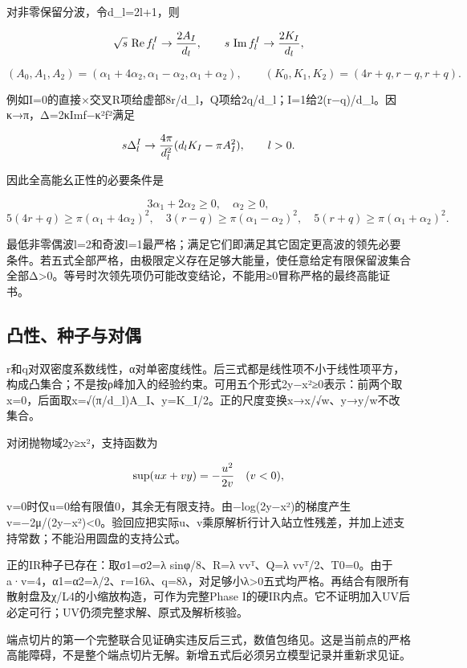\documentclass[
  10pt,
  a4paper,
]{article}
\begin{document}
对非零保留分波，令d\_l=2l+1，则

\[
\sqrt{s}\,\operatorname{Re}f_l^I\to{2A_I\over d_l},
\qquad s\,\operatorname{Im}f_l^I\to{2K_I\over d_l},
\]

\[
(A_0,A_1,A_2)=(\alpha_1+4\alpha_2,\alpha_1-\alpha_2,\alpha_1+\alpha_2),
\qquad(K_0,K_1,K_2)=(4r+q,r-q,r+q).
\]

例如I=0的直接×交叉R项给虚部8r/d\_l，Q项给2q/d\_l；I=1给2(r−q)/d\_l。因κ→π，Δ=2κImf−κ²\textbar f\textbar²满足

\[
s\Delta_l^I\to {4\pi\over d_l^2}(d_lK_I-\pi A_I^2),\qquad l>0.
\]

因此全高能幺正性的必要条件是

\[
3\alpha_1+2\alpha_2\ge0,\quad\alpha_2\ge0,
\] \[
5(4r+q)\ge\pi(\alpha_1+4\alpha_2)^2,
\quad3(r-q)\ge\pi(\alpha_1-\alpha_2)^2,
\quad5(r+q)\ge\pi(\alpha_1+\alpha_2)^2.
\]

最低非零偶波l=2和奇波l=1最严格；满足它们即满足其它固定更高波的领先必要条件。若五式全部严格，由极限定义存在足够大能量，使任意给定有限保留波集合全部Δ\textgreater0。等号时次领先项仍可能改变结论，不能用≥0冒称严格的最终高能证书。

\subsection{凸性、种子与对偶}\label{ux51f8ux6027ux79cdux5b50ux4e0eux5bf9ux5076}

r和q对双密度系数线性，α对单密度线性。后三式都是线性项不小于线性项平方，构成凸集合；不是按ρ峰加入的经验约束。可用五个形式2y−x²≥0表示：前两个取x=0，后面取x=√(π/d\_l)A\_I、y=K\_I/2。正的尺度变换x→x/√w、y→y/w不改集合。

对闭抛物域2y≥x²，支持函数为

\[
\sup (u x+v y)=-{u^2\over2v}\quad(v<0),
\]

v=0时仅u=0给有限值0，其余无有限支持。由−log(2y−x²)的梯度产生v=−2μ/(2y−x²)\textless0。验回应把实际u、v乘原解析行计入站立性残差，并加上述支持常数；不能沿用圆盘的支持公式。

正的IR种子已存在：取σ1=σ2=λ sinφ/8、R=λ vvᵀ、Q=λ
vvᵀ/2、T0=0。由于a·v=4，α1=α2=λ/2、r=16λ、q=8λ，对足够小λ\textgreater0五式均严格。再结合有限所有散射盘及χ/L4的小缩放构造，可作为完整Phase
I的硬IR内点。它不证明加入UV后必定可行；UV仍须完整求解、原式及解析核验。

端点切片的第一个完整联合见证确实违反后三式，数值包络见。这是当前点的严格高能障碍，不是整个端点切片无解。新增五式后必须另立模型记录并重新求见证。
\end{document}
